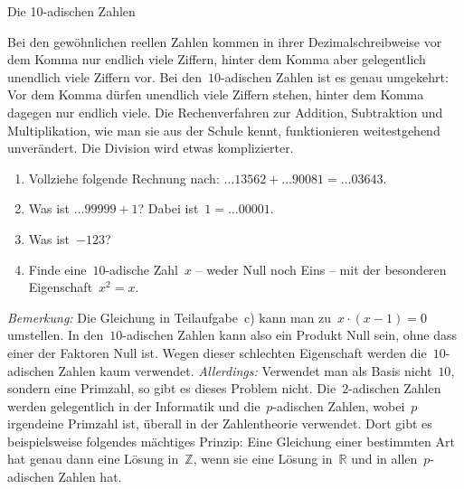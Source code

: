\documentclass{../zirkelblatt1415}
\begin{document}
\begin{aufgabe}{Die 10-adischen Zahlen}
{\scriptsize
Bei den gewöhnlichen reellen Zahlen kommen in ihrer Dezimalschreibweise vor dem
Komma nur endlich viele Ziffern, hinter dem Komma aber gelegentlich unendlich
viele Ziffern vor. Bei den~$10$-adischen Zahlen ist es genau umgekehrt: Vor dem
Komma dürfen unendlich viele Ziffern stehen, hinter dem Komma dagegen nur
endlich viele. Die Rechenverfahren zur Addition, Subtraktion und
Multiplikation, wie man sie aus der Schule kennt, funktionieren weitestgehend
unverändert. Die Division wird etwas komplizierter.\par}
\begin{enumerate}
\item Vollziehe folgende Rechnung nach:
$\ldots 13562 + \ldots 90081 = \ldots 03643$.
\item Was ist $\ldots 99999 + 1$? Dabei ist~$1 = \ldots 00001$.
\item Was ist~$-123$?
\item Finde eine~$10$-adische Zahl~$x$ -- weder Null noch Eins -- mit der
besonderen Eigenschaft~$x^2 = x$.
\end{enumerate}
\scriptsize
\emph{Bemerkung:} Die Gleichung in Teilaufgabe~c) kann man zu~$x \cdot (x-1) =
0$ umstellen. In den~$10$-adischen Zahlen kann also ein Produkt Null sein, ohne
dass einer der Faktoren Null ist. Wegen dieser schlechten Eigenschaft werden
die~$10$-adischen Zahlen kaum verwendet. \emph{Allerdings:} Verwendet man als
Basis nicht~$10$, sondern eine Primzahl, so gibt es dieses Problem nicht.
Die~$2$-adischen Zahlen werden gelegentlich in der Informatik und
die~$p$-adischen Zahlen, wobei~$p$ irgendeine Primzahl ist, überall in der
Zahlentheorie verwendet. Dort gibt es beispielsweise folgendes mächtiges
Prinzip: Eine Gleichung einer bestimmten Art hat genau dann eine Lösung
in~$\mathbb{Z}$, wenn sie eine Lösung in~$\mathbb{R}$ und in allen~$p$-adischen
Zahlen hat.\par
\end{aufgabe}
\end{document}
